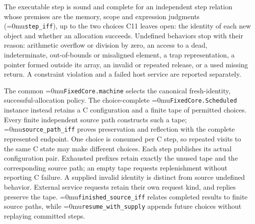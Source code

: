 \documentclass[11pt,a4paper]{article}
\newcommand{\name}[1]{\textup{\Urlmuskip=0mu\relax\nolinkurl{#1}}}
\begin{document}
\begin{center}
\end{center}

The executable step is sound and complete for an independent step relation whose
premises are the memory, scope and expression judgments (\name{step_iff}), up to the
two choices C11 leaves open: the identity of each new object and whether an
allocation succeeds. Undefined behaviors stop with their reason: arithmetic
overflow or division by zero, an access to a dead, indeterminate, out-of-bounds or
misaligned element, a trap representation, a pointer formed outside its array, an
invalid or repeated release, or a used missing return. A constraint violation and
a failed host service are reported separately.

The common \name{FixedCore.machine} selects the canonical fresh-identity,
successful-allocation policy. The choice-complete \name{FixedCore.Scheduled}
instance instead retains a C configuration and a finite tape of permitted
choices. Every finite independent source path constructs such a tape;
\name{source_path_iff} proves preservation and reflection with the complete
represented endpoint. One choice is consumed per C step, so repeated visits
to the same C state may make different choices. Each step publishes its actual
configuration pair. Exhausted prefixes retain exactly the unused tape and
the corresponding source path; an empty tape requests replenishment without
reporting C failure. A supplied invalid identity is distinct from source
undefined behavior. External service requests retain their own request kind,
and replies preserve the tape. \name{finished_source_iff} relates completed
results to finite source paths, while \name{resume_with_supply} appends future
choices without replaying committed steps.
\end{document}
